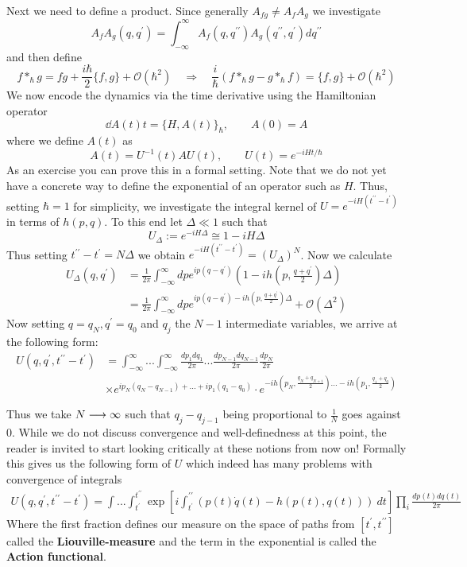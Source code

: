 \begin{example}
  Next we need to define a product. Since generally $A_{fg} \neq A_f A_g$ we investigate
  $$ A_f A_g (q, q^\prime) = \int_{-\infty}^\infty A_f(q, q^{\prime \prime}) A_g(q^{\prime \prime},q^\prime) dq^{\prime \prime} $$
  and then define
  $$ f *_\hbar g = fg + \frac{i\hbar}{2} \{f,g\} + \mathcal{O}(\hbar^2) \quad \Rightarrow \quad \frac{i}{\hbar} (f *_\hbar g - g *_\hbar f) = \{f,g\} + \mathcal{O}(\hbar^2)$$
  We now encode the dynamics via the time derivative using the Hamiltonian operator
  $$ \dd{A(t)}{t} = \{H, A(t)\}_\hbar , \quad \quad A(0) = A $$
  where we define $A(t)$ as
  $$ A(t) = U^{-1}(t) A U(t), \quad \quad U(t) = e^{-i H t / \hbar} $$
  As an exercise you can prove this in a formal setting. Note that we do not yet have a concrete way to define the exponential of an operator such as $H$. Thus, setting $\hbar = 1$ for simplicity, we investigate the integral kernel of $U = e^{-iH(t^{\prime \prime} - t^\prime)}$ in terms of $h(p,q)$. To this end let $\Delta \ll 1$ such that
  $$ U_\Delta := e^{-i H \Delta} \cong 1- i H \Delta $$
  Thus setting $t^{\prime \prime} - t^\prime = N \Delta$ we obtain $e^{-iH(t^{\prime \prime} - t^\prime)} = (U_\Delta)^N$. Now we calculate
  \begin{align}
    U_\Delta(q,q^\prime) &= \frac{1}{2\pi} \int_{-\infty}^\infty dp e^{ip(q-q^\prime)} \left( 1- i h\left(p, \frac{q+q^\prime}{2} \right) \Delta \right) \\
    &= \frac{1}{2\pi} \int_{-\infty}^\infty dp e^{ip(q-q^\prime) - i h\left(p, \frac{q+q^\prime}{2} \right) \Delta} + \mathcal{O}(\Delta^2)
  \end{align}
  Now setting $q = q_N, q^\prime = q_0$ and $q_j$ the $N-1$ intermediate variables, we arrive at the following form:
  \begin{align}
    U(q, q^\prime, t^{\prime\prime}-t^\prime) &= \int_{-\infty}^\infty ... \int_{-\infty}^\infty \frac{dp_1 dq_1}{2\pi} ... \frac{dp_{N-1} dq_{N-1}}{2\pi} \frac{dp_N}{2\pi}\\
    &\times e^{ip_{N}(q_{N}-q_{N-1}) + ... + ip_1(q_1-q_0)} \cdot e^{-ih\left(p_N, \frac{q_N + q_{N+1}}{2}\right) ... -ih\left( p_1, \frac{q_1 + q_0}{2} \right)}
  \end{align}

  Thus we take $N\longrightarrow \infty$ such that $q_j - q_{j-1}$ being proportional to $\frac{1}{N}$ goes against $0$. While we do not discuss convergence and well-definedness at this point, the reader is invited to start looking critically at these notions from now on! Formally this gives us the following form of $U$ which indeed has many problems with convergence of integrals
  \begin{align}
    U(q,q^\prime, t^{\prime\prime}-t^\prime) = \int ... \int_{t^\prime}^{t^{\prime\prime}}  \exp\left[i\int_{t^\prime}^{\prime \prime}( p(t)\dot q(t) - h(p(t),q(t)))\ dt \right] \prod_i \frac{dp(t) dq(t)}{2\pi}
  \end{align}
  Where the first fraction defines our measure on the space of paths from $[t^\prime, t^{\prime\prime}]$ called the \textbf{Liouville-measure} and the term in the exponential is called the \textbf{Action functional}.\\


\end{example}
